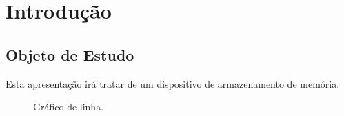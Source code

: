 \section{Introdução}

\subsection{Objeto de Estudo}
Esta apresentação irá tratar de um dispositivo de armazenamento de memória.

\begin{figure}[H]
    \centering
    
    \caption{Gráfico de linha.}
    \label{graph:linha}
\end{figure}

\subsubsection{}
